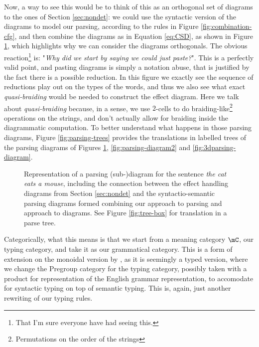 Now, a way to see this would be to think of this as an orthogonal set of
diagrams to the ones of Section \ref{sec:nondet}: we could use the syntactic
version of the diagrams to model our parsing, according to the rules in
Figure \ref{fig:combination-cfg}, and then combine the diagrams as in Equation
\ref{eq:CSD}, as shown in Figure \ref{fig:parsing-diagram}, which highlights
why we can consider the diagrams orthogonals.
The obvious reaction\footnote{That I'm sure everyone have had seeing this.} is:
"\emph{Why did we start by saying we could just paste?}".
This is a perfectly valid point, and pasting diagrams is simply a notation
abuse, that is justified by the fact there is a possible reduction.
In this figure we exactly see the sequence of reductions play out on the types
of the words, and thus we also see what exact \emph{quasi-braiding} would be
needed to construct the effect diagram.
Here we talk about \emph{quasi-braiding} because, in a sense, we use $2$-cells
to do braiding-like\footnote{Permutations on the order of the strings}
operations on the strings, and don't actually allow for braiding inside the
diagrammatic computation.
To better understand what happens in those parsing diagrams, Figure
\ref{fig:parsing-trees} provides the translations in labelled trees of the
parsing diagrams of Figures \ref{fig:parsing-diagram},
\ref{fig:parsing-diagram2} and \ref{fig:3dparsing-diagram}.


\begin{figure}
	\centering
	\caption{Representation of a parsing (sub-)diagram for the sentence
		\emph{the cat eats a mouse}, including the connection between the effect
		handling diagrams from Section \ref{sec:nondet} and the syntactio-semantic
		parsing diagrams formed combining our approach to parsing and
		\cite{coeckeMathematicalFoundationsCompositional2010} approach to diagrams.
		See Figure \ref{fig:tree-box} for translation in a parse tree.}
	\label{fig:parsing-diagram}
\end{figure}

Categorically, what this means is that we start from a meaning category $\mC$,
our typing category, and take it as our grammatical category.
This is a form of extension on the monoidal version by
, as it is seemingly a
typed version, where we change the Pregroup category for the typing category,
possibly taken with a product for representation of the English grammar
representation, to accomodate for syntactic typing on top of semantic typing.
This is, again, just another rewriting of our typing rules.

